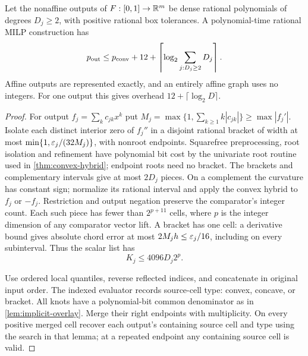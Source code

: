 \begin{theorem}\label{thm:arbitrary-vector-overlay}
Let the nonaffine outputs of $F:[0,1]\to\mathbb R^m$ be dense rational
polynomials of degrees $D_j\ge2$, with positive rational box tolerances.
A polynomial-time rational MILP construction has
\begin{equation}\label{eq:arbitrary-vector-count}
 p_{\mathrm{out}}\le p_{\mathrm{conv}}+12+\left\lceil\log_2\sum_{j:D_j\ge2}D_j\right\rceil.
\end{equation}
Affine outputs are represented exactly, and an entirely affine graph
uses no integers. For one output this gives overhead
$12+\lceil\log_2D\rceil$.
\end{theorem}
\begin{proof}
For output $f_j=\sum_kc_{jk}x^k$ put
$M_j=\max\{1,\sum_{k\ge1}k|c_{jk}|\}\ge\max|f_j'|$.
Isolate each distinct interior zero of $f_j''$ in a disjoint rational
bracket of width at most $\min\{1,\varepsilon_j/(32M_j)\}$, with nonroot
endpoints. Squarefree preprocessing, root isolation and refinement have
polynomial bit cost by the univariate root routine used in
\cref{thm:convex-hybrid}; endpoint roots need no bracket.
The brackets and complementary intervals give at most $2D_j$ pieces.
On a complement the curvature has constant sign; normalize its rational
interval and apply the convex hybrid to $f_j$ or $-f_j$.
Restriction and output negation preserve the comparator's integer count.
Each such piece has fewer than $2^{p+11}$ cells, where $p$ is the
integer dimension of any comparator vector lift. A bracket has one cell:
a derivative bound gives absolute chord error at most
$2M_jh\le\varepsilon_j/16$, including on every subinterval.
Thus the scalar list has
\begin{equation}\label{eq:arbitrary-scalar-cells}
 K_j\le4096D_j2^p.
\end{equation}

Use ordered local quantiles, reverse reflected indices, and concatenate
in original input order. The indexed evaluator records source-cell type:
convex, concave, or bracket. All knots have a polynomial-bit common
denominator as in \cref{lem:implicit-overlay}. Merge their right
endpoints with multiplicity. On every positive merged cell recover each
output's containing source cell and type using the search in that lemma;
at a repeated endpoint any containing source cell is valid.


\end{proof}
